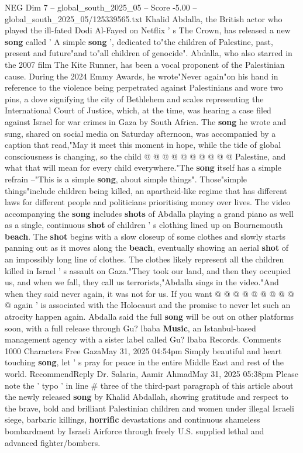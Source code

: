 \begin{textsample}{NEG Dim 7 – global\_south\_2025\_05 – Score -5.00 – global\_south\_2025\_05/125339565.txt}  \label{ex:f7_neg_218}
Khalid Abdalla, the British actor who played the ill-fated Dodi Al-Fayed on Netflix ' s The Crown, has released a new \textbf{song} called ' A simple \textbf{song} ', dedicated to"the children of Palestine, past, present and future"and to"all children of genocide".
Abdalla, who also starred in the 2007 film The Kite Runner, has been a vocal proponent of the Palestinian cause.
During the 2024 Emmy Awards, he wrote"Never again"on his hand in reference to the violence being perpetrated against Palestinians and wore two pins, a dove signifying the city of Bethlehem and scales representing the International Court of Justice, which, at the time, was hearing a case filed against Israel for war crimes in Gaza by South Africa.
The \textbf{song} he wrote and sung, shared on social media on Saturday afternoon, was accompanied by a caption that read,"May it meet this moment in hope, while the tide of global consciousness is changing, so the child @ @ @ @ @ @ @ @ @ @ Palestine, and what that will mean for every child everywhere."The \textbf{song} itself has a simple refrain --"This is a simple \textbf{song}, about simple things".
Those"simple things"include children being killed, an apartheid-like regime that has different laws for different people and politicians prioritising money over lives.
The video accompanying the \textbf{song} includes \textbf{shots} of Abdalla playing a grand piano as well as a single, continuous \textbf{shot} of children ' s clothing lined up on Bournemouth \textbf{beach}.
The \textbf{shot} begins with a slow closeup of some clothes and slowly starts panning out as it moves along the \textbf{beach}, eventually showing an aerial \textbf{shot} of an impossibly long line of clothes.
The clothes likely represent all the children killed in Israel ' s assault on Gaza."They took our land, and then they occupied us, and when we fall, they call us terrorists,"Abdalla sings in the video."And when they said never again, it was not for us.
If you want @ @ @ @ @ @ @ @ @ @ again ' is associated with the Holocaust and the promise to never let such an atrocity happen again.
Abdalla said the full \textbf{song} will be out on other platforms soon, with a full release through Gu? lbaba \textbf{Music}, an Istanbul-based management agency with a sister label called Gu? lbaba Records.
Comments 1000 Characters Free GazaMay 31, 2025 04:54pm Simply beautiful and heart touching \textbf{song}, let ' s pray for peace in the entire Middle East and rest of the world.
RecommendReply Dr.
Salaria, Aamir AhmadMay 31, 2025 05:38pm Please note the ' typo ' in line \# three of the third-past paragraph of this article about the newly released \textbf{song} by Khalid Abdallah, showing gratitude and respect to the brave, bold and brilliant Palestinian children and women under illegal Israeli siege, barbaric killings, \textbf{horrific} devastations and continuous shameless bombardment by Israeli Airforce through freely U.S. supplied lethal and advanced fighter/bombers.

\end{textsample}
